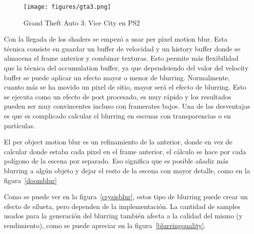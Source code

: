 \documentclass[withindex, glossary]{cam-thesis}
\begin{document}
\begin{figure}[!htbp]
    \texttt{[image: figures/gta3.png]}
    \caption{Grand Theft Auto 3: Vice City en PS2}
    \label{gta3}
\end{figure}

Con la llegada de los shaders se empezó a usar per pixel motion blur. Esta técnica consiste en guardar un buffer de velocidad y un history buffer donde se almacena el frame anterior y combinar texturas. Esto permite más flexibilidad que la técnica del accumulation buffer, ya que dependeiendo del valor del velocity buffer se puede aplicar un efecto mayor o menor de blurring. Normalmente, cuanto más se ha movido un pixel de sitio, mayor será el efecto de blurring. Esto se ejecuta como un efecto de post procesado, es muy rápido y los resultados pueden ser muy convincentes incluso con framerates bajos. Una de las desventajas es que es complicado calcular el blurring en escenas con transparencias o en partículas.

El per object motion blur es un refinamiento de la anterior, donde en vez de calcular donde estaba cada pixel en el frame anterior, el cálculo se hace por cada polígono de la escena por separado. Eso significa que es posible añadir más blurring a algún objeto y dejar el resto de la escena con mayor detalle, como en la figura~\ref{doomblur}

Como se puede ver en la figura~\ref{crysisblur}, estos tipo de blurring puede crear un efecto de silueta, pero dependen de la implementación. La cantidad de samples usados para la generación del blurring también afecta a la calidad del mismo (y rendimiento), como se puede apreciar en la figura~\ref{blurringquality}.
\end{document}
